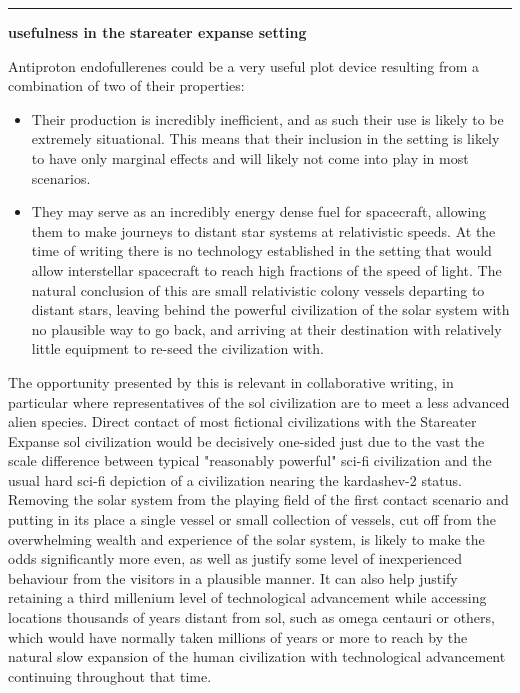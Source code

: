 \documentclass[a4paper]{article}
\begin{document}
	\begin{center}
		\rule{0.9\linewidth}{1pt}
		
		\medskip
		
		\textbf{usefulness in the stareater expanse setting}
	\end{center}
	
	Antiproton endofullerenes could be a very useful plot device resulting from a combination of two of their properties:
	
	\begin{itemize}
		\item Their production is incredibly inefficient, and as such their use is likely to be extremely situational.
		This means that their inclusion in the setting is likely to have only marginal effects and will likely not come into play in most scenarios.
		
		\item They may serve as an incredibly energy dense fuel for spacecraft, allowing them to make journeys to distant star systems at relativistic speeds.
		At the time of writing there is no technology established in the setting that would allow interstellar spacecraft to reach high fractions of the speed of light.
		The natural conclusion of this are small relativistic colony vessels departing to distant stars, leaving behind the powerful civilization of the solar system with no plausible way to go back, and arriving at their destination with relatively little equipment to re-seed the civilization with.
	\end{itemize}
	
	The opportunity presented by this is relevant in collaborative writing, in particular where representatives of the sol civilization are to meet a less advanced alien species.
	Direct contact of most fictional civilizations with the Stareater Expanse sol civilization would be decisively one-sided just due to the vast the scale difference between typical "reasonably powerful" sci-fi civilization and the usual hard sci-fi depiction of a civilization nearing the kardashev-2 status.
	Removing the solar system from the playing field of the first contact scenario and putting in its place a single vessel or small collection of vessels, cut off from the overwhelming wealth and experience of the solar system, is likely to make the odds significantly more even, as well as justify some level of inexperienced behaviour from the visitors in a plausible manner.
	It can also help justify retaining a third millenium level of technological advancement while accessing locations thousands of years distant from sol, such as omega centauri or others, which would have normally taken millions of years or more to reach by the natural slow expansion of the human civilization with technological advancement continuing throughout that time.
	
\end{document}
